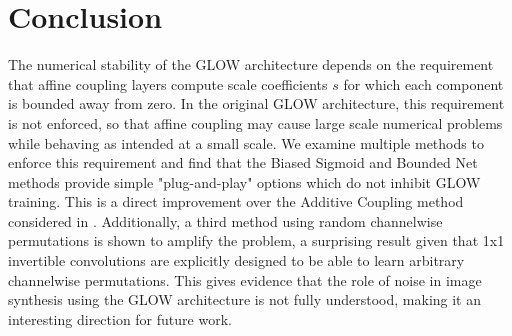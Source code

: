 \section{Conclusion}
The numerical stability of the GLOW architecture depends on the requirement that affine coupling layers compute scale coefficients $s$ for which each component is bounded away from zero. In the original GLOW architecture, this requirement is not enforced, so that affine coupling may cause large scale numerical problems while behaving as intended at a small scale. We examine multiple methods to enforce this requirement and find that the Biased Sigmoid and Bounded Net methods provide simple "plug-and-play" options which do not inhibit GLOW training.  This is a direct improvement over the Additive Coupling method considered in \cite{kingma2018glow}. Additionally, a third method using random channelwise permutations is shown to amplify the problem, a surprising result given that 1x1 invertible convolutions are explicitly designed to be able to learn arbitrary channelwise permutations. This gives evidence that the role of noise in image synthesis using the GLOW architecture is not fully understood, making it an interesting direction for future work.